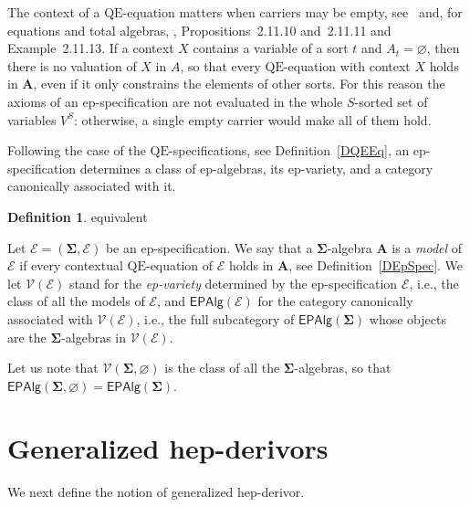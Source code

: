 \documentclass[a4paper, reqno]{amsbook}
\makeatletter
\newcommand{\sig}[1]{\mathbf{#1}}             %
\newcommand{\spec}[1]{\boldsymbol{\mathcal{#1}}} %
\newcommand{\QE}{\mathrm{QE}}
\theoremstyle{plain}
\theoremstyle{definition}
\newtheorem{definition}[theorem]{Definition}
\newcommand*{\CA@leanpending}{}
\newcommand*{\CA@leanrelation}{}
\newcommand*{\lean}[2]{%
  \ifcsname\string\color@lean@#1\endcsname\else
    \PackageError{main}{Unknown relation `#1' in \string\lean}{Use equivalent, weaker or stronger.}%
  \fi
  \gdef\CA@leanrelation{#1}%
  \gdef\CA@leanpending{#2}}
\makeatother
\begin{document}
The context of a $\QE$-equation matters when carriers may be empty, see~\cite{GoguenMeseguer1985} and, for equations and total algebras, \cite{Soliveres2000}, Propositions~2.11.10 and~2.11.11 and Example~2.11.13.
If a context $X$ contains a variable of a sort $t$ and $A_{t}=\varnothing$, then there is no valuation of $X$ in $A$, so that every $\QE$-equation with context $X$ holds in $\mathbf{A}$, even if it only constrains the elements of other sorts.
For this reason the axioms of an ep-specification are not evaluated in the whole $S$-sorted set of variables $V^{S}$: otherwise, a single empty carrier would make all of them hold.

Following the case of the $\QE$-specifications, see Definition~\ref{DQEEq}, an ep-specification determines a class of ep-algebras, its ep-variety, and a category canonically associated with it.

\begin{definition}\label{DEpVariety}\lean{equivalent}{EPSpecification.IsModel,EPSpecification.variety}
Let $\spec{E}=(\sig{\Sigma},\mathcal{E})$ be an ep-specification.
We say that a $\sig{\Sigma}$-algebra $\mathbf{A}$ is a \emph{model} of $\spec{E}$ if every contextual $\QE$-equation of $\mathcal{E}$ holds in $\mathbf{A}$, see Definition~\ref{DEpSpec}.
We let $\mathcal{V}(\spec{E})$ stand for the \emph{ep-variety} determined by the ep-specification $\spec{E}$, i.e., the class of all the models of $\spec{E}$, and $\mathsf{EPAlg}(\spec{E})$ for the category canonically associated with $\mathcal{V}(\spec{E})$, i.e., the full subcategory of $\mathsf{EPAlg}(\sig{\Sigma})$ whose objects are the $\sig{\Sigma}$-algebras in $\mathcal{V}(\spec{E})$.
\end{definition}

Let us note that $\mathcal{V}(\sig{\Sigma},\varnothing)$ is the class of all the $\sig{\Sigma}$-algebras, so that $\mathsf{EPAlg}(\sig{\Sigma},\varnothing)=\mathsf{EPAlg}(\sig{\Sigma})$.

\section{Generalized hep-derivors}\label{SGenHepDerivorsDef}

We next define the notion of generalized hep-derivor.
\end{document}
